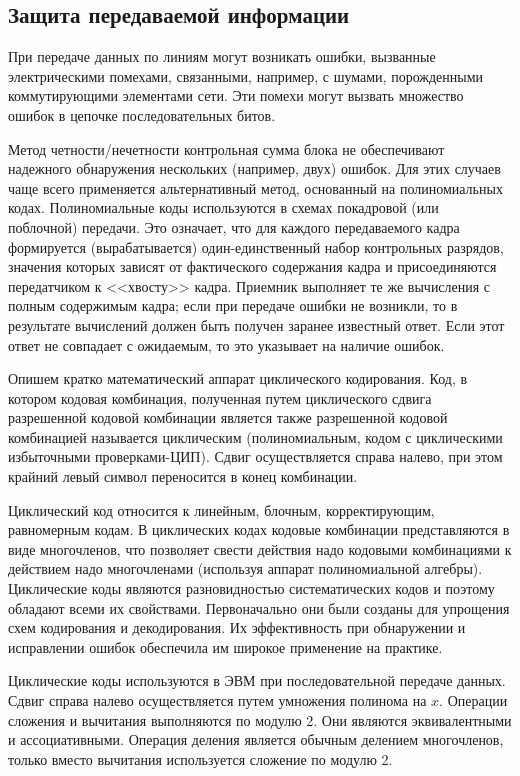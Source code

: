 \documentclass[russian,utf8,simple,emptystyle]{eskdtext}
\begin{document}
\subsection{Защита передаваемой информации}
При передаче данных по линиям могут возникать ошибки, вызванные электрическими помехами, связанными, например, с шумами, порожденными коммутирующими элементами сети. Эти помехи могут вызвать множество ошибок в цепочке последовательных битов.

Метод четности/нечетности контрольная сумма блока не обеспечивают надежного обнаружения нескольких (например, двух) ошибок. Для этих случаев чаще всего применяется альтернативный метод, основанный на полиномиальных кодах. Полиномиальные коды используются в схемах покадровой (или поблочной) передачи. Это означает, что для каждого передаваемого кадра формируется (вырабатывается) один-единственный набор контрольных разрядов, значения которых зависят от фактического содержания кадра и присоединяются передатчиком к <<хвосту>> кадра. Приемник выполняет те же вычисления с полным содержимым кадра; если при передаче ошибки не возникли, то в результате вычислений должен быть получен заранее известный ответ. Если этот ответ не совпадает с ожидаемым, то это указывает на наличие ошибок.

Опишем кратко математический аппарат циклического кодирования. Код, в котором кодовая комбинация, полученная путем циклического сдвига разрешенной кодовой комбинации является также разрешенной кодовой комбинацией называется циклическим (полиномиальным, кодом с циклическими избыточными проверками-ЦИП). Сдвиг осуществляется справа налево, при этом крайний левый символ переносится в конец комбинации. 

Циклический код относится к линейным, блочным, корректирующим, равномерным кодам. В циклических кодах кодовые комбинации представляются в виде многочленов, что позволяет свести действия надо кодовыми комбинациями к действием надо многочленами (используя аппарат полиномиальной алгебры). Циклические коды являются разновидностью систематических кодов и поэтому обладают всеми их свойствами. Первоначально они были созданы для упрощения схем кодирования и декодирования. Их эффективность при обнаружении и исправлении ошибок обеспечила им широкое применение на практике.

Циклические коды используются в ЭВМ при последовательной передаче данных. Сдвиг справа налево осуществляется путем умножения полинома на $x$. Операции сложения и вычитания выполняются по модулю 2. Они являются эквивалентными и ассоциативными. Операция деления является обычным делением многочленов, только вместо вычитания используется сложение по модулю 2.
\end{document}
